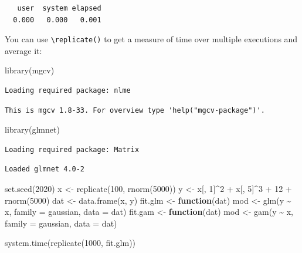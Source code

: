 \documentclass[
]{book}
\newenvironment{Shaded}{\begin{snugshade}}{\end{snugshade}}
\newcommand{\AttributeTok}[1]{\textcolor[rgb]{0.77,0.63,0.00}{#1}}
\newcommand{\ControlFlowTok}[1]{\textcolor[rgb]{0.13,0.29,0.53}{\textbf{#1}}}
\newcommand{\DecValTok}[1]{\textcolor[rgb]{0.00,0.00,0.81}{#1}}
\newcommand{\FunctionTok}[1]{\textcolor[rgb]{0.00,0.00,0.00}{#1}}
\newcommand{\NormalTok}[1]{#1}
\newcommand{\OtherTok}[1]{\textcolor[rgb]{0.56,0.35,0.01}{#1}}
\newcommand{\SpecialCharTok}[1]{\textcolor[rgb]{0.00,0.00,0.00}{#1}}
\begin{document}
\begin{verbatim}
   user  system elapsed 
  0.000   0.000   0.001 
\end{verbatim}

You can use \texttt{\textbackslash{}replicate()} to get a measure of time over multiple executions and average it:

\begin{Shaded}
\begin{Highlighting}[]
\FunctionTok{library}\NormalTok{(mgcv)}
\end{Highlighting}
\end{Shaded}

\begin{verbatim}
Loading required package: nlme
\end{verbatim}

\begin{verbatim}
This is mgcv 1.8-33. For overview type 'help("mgcv-package")'.
\end{verbatim}

\begin{Shaded}
\begin{Highlighting}[]
\FunctionTok{library}\NormalTok{(glmnet)}
\end{Highlighting}
\end{Shaded}

\begin{verbatim}
Loading required package: Matrix
\end{verbatim}

\begin{verbatim}
Loaded glmnet 4.0-2
\end{verbatim}

\begin{Shaded}
\begin{Highlighting}[]
\FunctionTok{set.seed}\NormalTok{(}\DecValTok{2020}\NormalTok{)}
\NormalTok{x }\OtherTok{\textless{}{-}} \FunctionTok{replicate}\NormalTok{(}\DecValTok{100}\NormalTok{, }\FunctionTok{rnorm}\NormalTok{(}\DecValTok{5000}\NormalTok{))}
\NormalTok{y }\OtherTok{\textless{}{-}}\NormalTok{ x[, }\DecValTok{1}\NormalTok{]}\SpecialCharTok{\^{}}\DecValTok{2} \SpecialCharTok{+}\NormalTok{ x[, }\DecValTok{5}\NormalTok{]}\SpecialCharTok{\^{}}\DecValTok{3} \SpecialCharTok{+} \DecValTok{12} \SpecialCharTok{+} \FunctionTok{rnorm}\NormalTok{(}\DecValTok{5000}\NormalTok{)}
\NormalTok{dat }\OtherTok{\textless{}{-}} \FunctionTok{data.frame}\NormalTok{(x, y)}
\NormalTok{fit.glm }\OtherTok{\textless{}{-}} \ControlFlowTok{function}\NormalTok{(dat) mod }\OtherTok{\textless{}{-}} \FunctionTok{glm}\NormalTok{(y }\SpecialCharTok{\textasciitilde{}}\NormalTok{ x, }\AttributeTok{family =}\NormalTok{ gaussian, }\AttributeTok{data =}\NormalTok{ dat)}
\NormalTok{fit.gam }\OtherTok{\textless{}{-}} \ControlFlowTok{function}\NormalTok{(dat) mod }\OtherTok{\textless{}{-}} \FunctionTok{gam}\NormalTok{(y }\SpecialCharTok{\textasciitilde{}}\NormalTok{ x, }\AttributeTok{family =}\NormalTok{ gaussian, }\AttributeTok{data =}\NormalTok{ dat)}
    
\FunctionTok{system.time}\NormalTok{(}\FunctionTok{replicate}\NormalTok{(}\DecValTok{1000}\NormalTok{, fit.glm))}
\end{Highlighting}
\end{Shaded}
\end{document}
